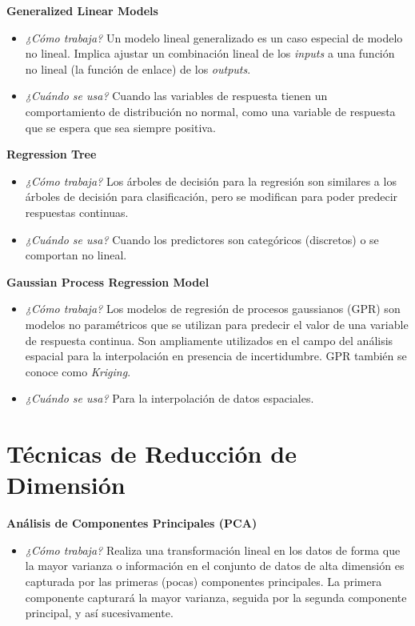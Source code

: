 \documentclass[]{book}
\providecommand{\tightlist}{%
  \setlength{\itemsep}{0pt}\setlength{\parskip}{0pt}}
\begin{document}
\textbf{Generalized Linear Models}

\begin{itemize}
\item
  \emph{¿Cómo trabaja?} Un modelo lineal generalizado es un caso especial de modelo no lineal. Implica ajustar un combinación lineal de los \emph{inputs} a una función no lineal (la función de enlace) de los \emph{outputs}.
\item
  \emph{¿Cuándo se usa?} Cuando las variables de respuesta tienen un comportamiento de distribución no normal, como una variable de respuesta que se espera que sea siempre positiva.
\end{itemize}

\textbf{Regression Tree}

\begin{itemize}
\item
  \emph{¿Cómo trabaja?} Los árboles de decisión para la regresión son similares a los árboles de decisión para
  clasificación, pero se modifican para poder predecir respuestas continuas.
\item
  \emph{¿Cuándo se usa?} Cuando los predictores son categóricos (discretos) o se comportan
  no lineal.
\end{itemize}

\textbf{Gaussian Process Regression Model}

\begin{itemize}
\item
  \emph{¿Cómo trabaja?} Los modelos de regresión de procesos gaussianos (GPR) son modelos no paramétricos que se utilizan para predecir el valor de una variable de respuesta continua. Son ampliamente utilizados en
  el campo del análisis espacial para la interpolación en presencia de incertidumbre. GPR también se conoce como \emph{Kriging}.
\item
  \emph{¿Cuándo se usa?} Para la interpolación de datos espaciales.
\end{itemize}

\hypertarget{tecnicas-de-reduccion-de-dimension}{%
\section{Técnicas de Reducción de Dimensión}\label{tecnicas-de-reduccion-de-dimension}}

\textbf{Análisis de Componentes Principales (PCA)}

\begin{itemize}
\tightlist
\item
  \emph{¿Cómo trabaja?} Realiza una transformación lineal en los datos de forma que la mayor varianza o información en el conjunto de datos de alta dimensión es capturada por las primeras (pocas) componentes principales. La primera componente capturará la mayor varianza, seguida por la segunda componente principal, y así sucesivamente.
\end{itemize}
\end{document}
